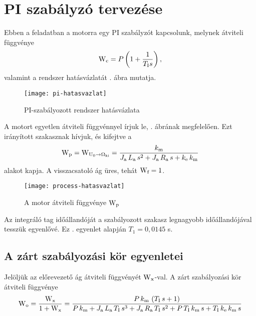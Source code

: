 \section{PI szabályzó tervezése}


Ebben a feladatban a motorra egy PI szabályzót kapcsolunk, melynek átviteli függvénye
\begin{equation}
	\mathrm{W}_\text{c} = P\left(1+\frac{1}{T_\text{I}s}\right),
\end{equation}
valamint a rendszer hatásvázlatát . ábra mutatja.

\begin{figure}[H]
	\centering
	\texttt{[image: pi-hatasvazlat]}
	\caption{PI-szabályozott rendszer hatásvázlata}
	\label{fig:pi-hatasvazlat}
\end{figure}

A motort egyetlen átviteli függvénnyel írjuk le, 
. ábrának megfelelően.
Ezt irányított szakasznak hívjuk, és kifejtve a
\begin{equation}
	\mathrm{W}_\text{p} = \mathrm{W}_{\mathrm{U}_0\rightarrow\Omega_\text{ki}} =
	\frac{k_\text{m}}{J_\text{a}\, L_\text{a}\, s^2 + J_\text{a}\, R_\text{a}\, s + k_\text{e}\, k_\text{m}}
\end{equation}
alakot kapja.
A visszacsatoló ág üres, tehát $\mathrm{W}_\text{f} = 1$.

\begin{figure}[H]
	\centering
	\texttt{[image: process-hatasvazlat]}
	\caption{A motor átviteli függvénye $\mathrm{W}_\text{p}$}
	\label{fig:process-hatasvazlat}
\end{figure}

Az integráló tag időállandóját a szabályozott szakasz legnagyobb időállandójával
tesszük egyenlővé. Ez . egyenlet alapján $T_1 = 0,0145$ s.


\subsection{A zárt szabályozási kör egyenletei}

Jelöljük az előrevezető ág átviteli függvényét $\mathrm{W}_\text{x}$-val.
A zárt szabályozási kör átviteli függvénye
\begin{equation}\label{eq:W-x}
	\mathrm{W}_\text{o} = \frac{\mathrm{W}_\text{x}}{1 + \mathrm{W}_\text{x}} =
	\frac{P\, k_\text{m}\, \left(T_\text{I}\, s + 1\right)}{P\, k_\text{m} + J_\text{a}\, L_\text{a}\, T_\text{I}\, s^3 + J_\text{a}\, R_\text{a}\, T_\text{I}\, s^2 + P\, T_\text{I}\, k_\text{m}\, s + T_\text{I}\, k_\text{e}\, k_\text{m}\, s}
\end{equation}


